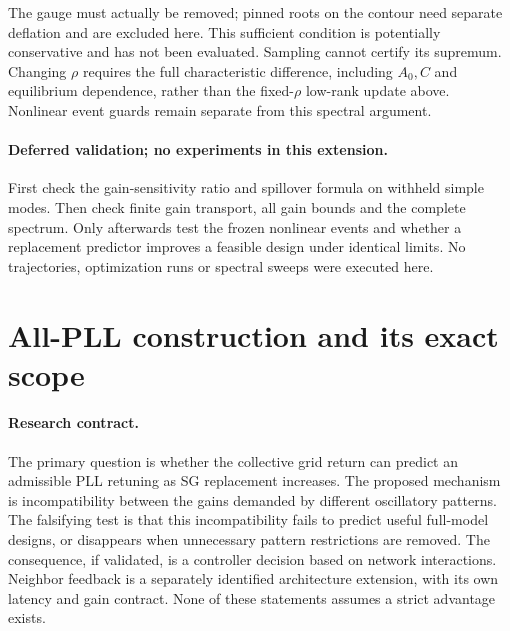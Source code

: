 \documentclass[11pt]{article}
\begin{document}
The gauge must actually be removed; pinned roots on the contour
need separate deflation and are excluded here.
This sufficient condition is potentially conservative and has not
been evaluated. Sampling cannot certify its supremum.
Changing $\rho$ requires the full characteristic difference,
including $A_0,C$ and equilibrium dependence, rather than the
fixed-$\rho$ low-rank update above. Nonlinear event guards remain
separate from this spectral argument.

\paragraph{Deferred validation; no experiments in this extension.}
First check the gain-sensitivity ratio and spillover formula on
withheld simple modes. Then check finite gain transport, all
gain bounds and the complete spectrum. Only afterwards test
the frozen nonlinear events and whether a replacement predictor
improves a feasible design under identical limits. No trajectories,
optimization runs or spectral sweeps were executed here.

\section{All-PLL construction and its exact scope}\label{sec:closure}

\paragraph{Research contract.}
The primary question is whether the collective grid return can predict
an admissible PLL retuning as SG replacement increases. The proposed
mechanism is incompatibility between the gains demanded by different
oscillatory patterns. The falsifying test is that this incompatibility
fails to predict useful full-model designs, or disappears when unnecessary
pattern restrictions are removed. The consequence, if validated, is a
controller decision based on network interactions. Neighbor feedback is
a separately identified architecture extension, with its own latency and
gain contract. None of these statements assumes a strict advantage exists.
\end{document}
